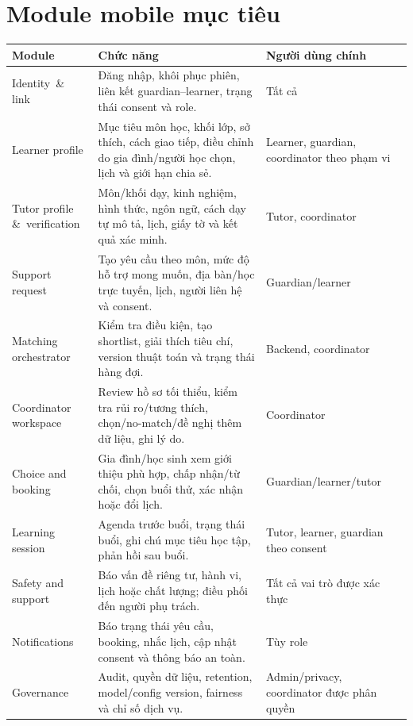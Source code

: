 \documentclass[11pt,a4paper]{article}
\begin{document}
\section{Module mobile mục tiêu}

\begin{tabularx}{\textwidth}{p{3.2cm}p{5.9cm}Y}
\toprule
\textbf{Module} & \textbf{Chức năng} & \textbf{Người dùng chính} \\
\midrule
Identity \,\&\, link & Đăng nhập, khôi phục phiên, liên kết guardian--learner, trạng thái consent và role. & Tất cả \\
Learner profile & Mục tiêu môn học, khối lớp, sở thích, cách giao tiếp, điều chỉnh do gia đình/người học chọn, lịch và giới hạn chia sẻ. & Learner, guardian, coordinator theo phạm vi \\
Tutor profile \,\&\, verification & Môn/khối dạy, kinh nghiệm, hình thức, ngôn ngữ, cách dạy tự mô tả, lịch, giấy tờ và kết quả xác minh. & Tutor, coordinator \\
Support request & Tạo yêu cầu theo môn, mức độ hỗ trợ mong muốn, địa bàn/học trực tuyến, lịch, người liên hệ và consent. & Guardian/learner \\
Matching orchestrator & Kiểm tra điều kiện, tạo shortlist, giải thích tiêu chí, version thuật toán và trạng thái hàng đợi. & Backend, coordinator \\
Coordinator workspace & Review hồ sơ tối thiểu, kiểm tra rủi ro/tương thích, chọn/no-match/đề nghị thêm dữ liệu, ghi lý do. & Coordinator \\
Choice and booking & Gia đình/học sinh xem giới thiệu phù hợp, chấp nhận/từ chối, chọn buổi thử, xác nhận hoặc đổi lịch. & Guardian/learner/tutor \\
Learning session & Agenda trước buổi, trạng thái buổi, ghi chú mục tiêu học tập, phản hồi sau buổi. & Tutor, learner, guardian theo consent \\
Safety and support & Báo vấn đề riêng tư, hành vi, lịch hoặc chất lượng; điều phối đến người phụ trách. & Tất cả vai trò được xác thực \\
Notifications & Báo trạng thái yêu cầu, booking, nhắc lịch, cập nhật consent và thông báo an toàn. & Tùy role \\
Governance & Audit, quyền dữ liệu, retention, model/config version, fairness và chỉ số dịch vụ. & Admin/privacy, coordinator được phân quyền \\
\bottomrule
\end{tabularx}
\end{document}
